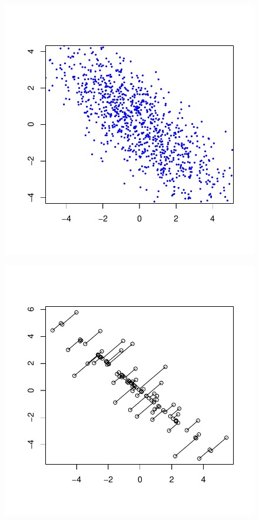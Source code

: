 \documentclass{article}
\begin{document}
\begin{figure} \centering
	\includegraphics[scale=\sscale]{vscatter}
	\caption{} \label{fig:vscatter}
\end{figure}
\begin{figure} \centering
	\includegraphics[scale=\sscale]{proj}
	\caption{} \label{fig:proj}
\end{figure}
\end{document}
